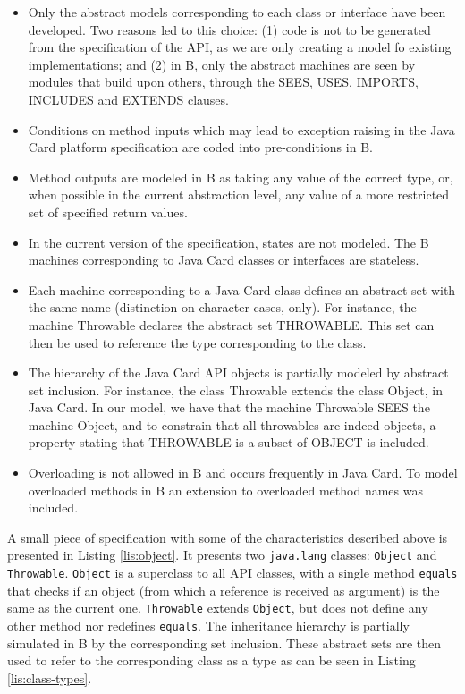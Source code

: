\documentclass{llncs}
\begin{document}
\begin{itemize}

\item Only the abstract models corresponding to each class or
  interface have been developed. Two reasons led to this choice: (1)
  code is not to be generated from the specification of the API, as we
  are only creating a model fo existing implementations; and
  (2) in B, only the abstract machines are seen by modules that build
  upon others, through the SEES, USES, IMPORTS, INCLUDES and EXTENDS
  clauses.

\item Conditions on method inputs which may lead to exception raising
  in the Java Card platform specification are coded into
  pre-conditions in B.
  
\item Method outputs are modeled in B as taking any value of the
  correct type, or, when possible in the current abstraction level,
  any value of a more restricted set of specified return values.
  
\item In the current version of the specification, states are not
  modeled.  The B machines corresponding to Java Card classes or
  interfaces are stateless.
  
\item Each machine corresponding to a Java Card class defines an
  abstract set with the same name (distinction on character cases,
  only). For instance, the machine Throwable declares the abstract set
  THROWABLE. This set can then be used to reference the type
  corresponding to the class.

\item The hierarchy of the Java Card API objects is partially modeled
  by abstract set inclusion. For instance, the class Throwable extends
  the class Object, in Java Card. In our model, we  have that the
  machine Throwable SEES the machine Object, and to constrain that all throwables are indeed
  objects, a property stating that THROWABLE is a subset of OBJECT is
  included.

\item Overloading is not allowed in B and occurs frequently in Java
  Card. To model overloaded methods in B an extension to overloaded
  method names was included.
  
  \end{itemize}

A small piece of specification with some of the characteristics described above is presented in Listing \ref{lis:object}. It presents two \texttt{java.lang} classes: \texttt{Object} and \texttt{Throwable}.  \texttt{Object} is a superclass to  all API classes, with a single method  \texttt{equals} that checks if an object (from which a reference is received as argument) is the same as the current one. \texttt{Throwable} extends \texttt{Object}, but does not define any other method nor redefines \texttt{equals}. The inheritance hierarchy is partially simulated in B by the corresponding set inclusion. These abstract sets are then used to refer to the corresponding class as a type as can be seen in Listing \ref{lis:class-types}.
\end{document}
